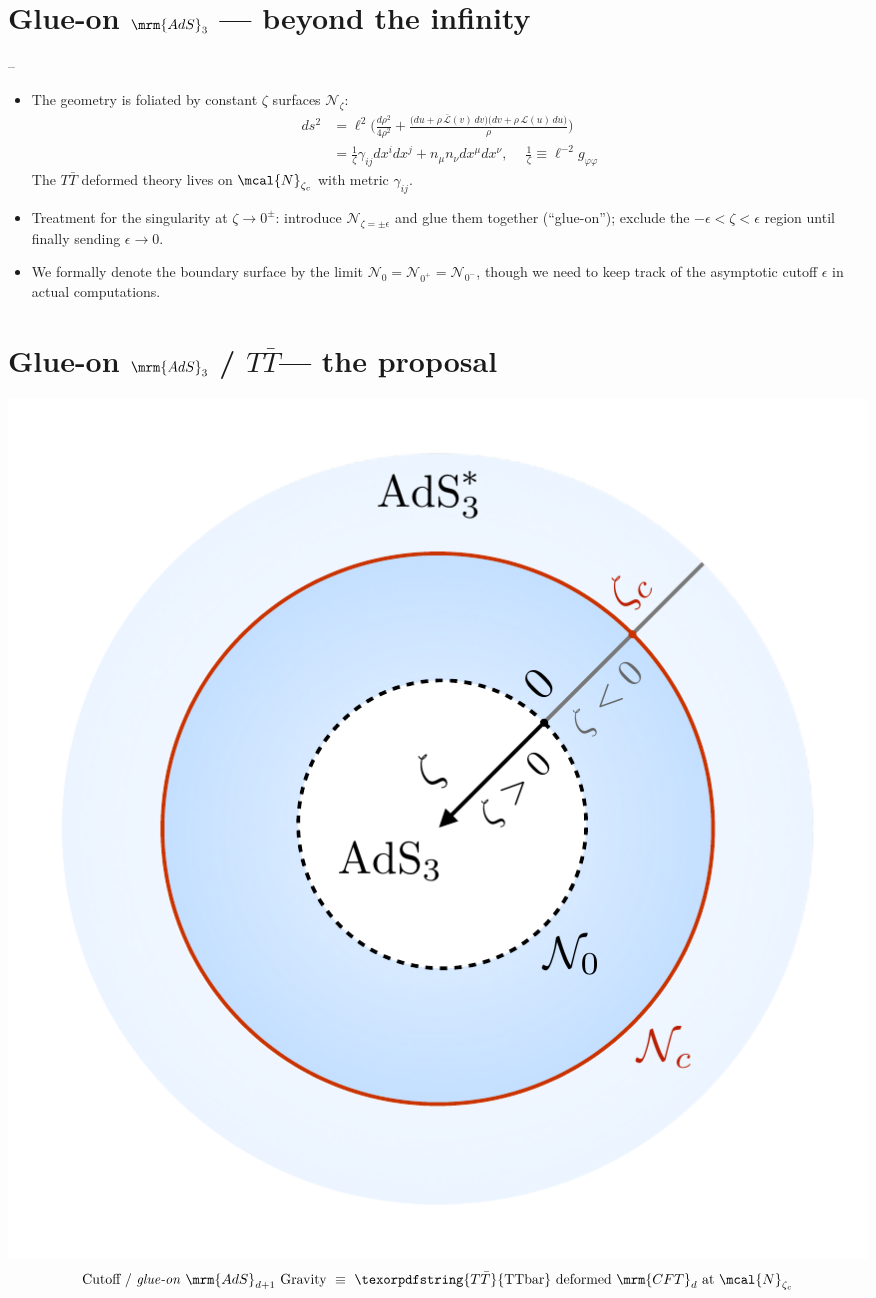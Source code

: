 \documentclass[11pt]{article}
\renewenvironment{frame}[1]%
	{\section*{#1}}%
	{}
\newcommand{\TTbar}{\texorpdfstring{\ensuremath{T\bar{T}}}{TTbar}\xspace}
\begin{document}
\begin{multicols}{3}
\begin{frame}{Glue-on $\mrm{AdS}_3$ --- beyond the infinity}{%
	\textcite{Apolo:2023vnm} -- 
}
\begin{itemize}
\item The geometry is foliated by constant $\zeta$ surfaces ${\mathcal N}_\zeta$:
	\begin{equation}
	\begin{aligned}
		ds^2 
		&= \ell^2 \bigg( \frac{d\rho^2}{4 \rho^2} + \frac{ \big( du + \rho \, \mathcal {\bar L}(v)\, dv \big) \big( dv + \rho \, \mathcal L(u)\, du \big) }{\rho} \bigg) \\
		&= \frac{1}{\zeta} \gamma_{ij}dx^i dx^j+n_\mu n_\nu dx^\mu dx^\nu,\ \quad
	\frac{1}{\zeta} \equiv \ell^{-2} g_{\varphi\varphi}
	\end{aligned}
	\end{equation}
	The \TTbar deformed theory lives on $\mcal{N}_{\zeta_c}$ with metric $\gamma_{ij}$.
	

\item Treatment for the singularity at $\zeta\to 0^\pm$: introduce $\mathcal N_{\zeta={\pm\epsilon}}$ and glue them together (``glue-on'');
	exclude the $-\epsilon < \zeta < \epsilon$ region until finally sending $\epsilon \to 0$. 
\item We formally denote the boundary surface by the limit $\mathcal N_{0}=\mathcal N_{0^+}=\mathcal N_{0^-}$, though we need to keep track of the asymptotic cutoff $\epsilon$ in actual computations.
\end{itemize}
\end{frame}

\newcommand{\stateGlueon}{\ensuremath{
	\textrm{Cutoff / \textit{glue-on} $\mrm{AdS}_{d+1}$ Gravity}
	\ \equiv\ %
	\textrm{\TTbar deformed $\mrm{CFT}_{d}$ at $\mcal{N}_{\zeta_c}$}
}}

\begin{frame}{Glue-on $\mrm{AdS}_3$ / \TTbar --- the proposal}{}

\begin{center}
\includegraphics[width=.6\linewidth]{img/diagram.pdf}
\begin{equation*}
\stateGlueon
\end{equation*}
\end{center}


\end{frame}
\end{multicols}
\end{document}
